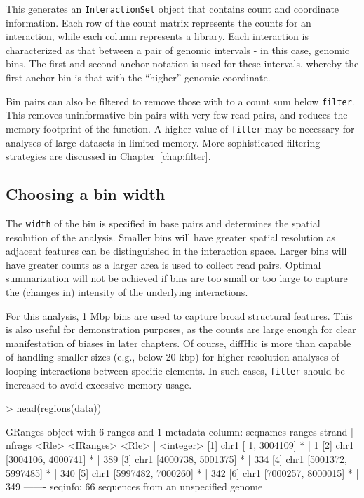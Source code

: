 \documentclass[12pt]{report}
\renewenvironment{Schunk}{\vspace{0pt}}{\vspace{0pt}}
\newcommand{\pkgname}{diffHic}
\newcommand{\code}[1]{{\small\texttt{#1}}}
\begin{document}
This generates an \code{InteractionSet} object that contains count and coordinate information.
Each row of the count matrix represents the counts for an interaction, while each column represents a library.
Each interaction is characterized as that between a pair of genomic intervals - in this case, genomic bins.
The first and second anchor notation is used for these intervals, whereby the first anchor bin is that with the ``higher'' genomic coordinate.

Bin pairs can also be filtered to remove those with to a count sum below \code{filter}.
This removes uninformative bin pairs with very few read pairs, and reduces the memory footprint of the function.
A higher value of \code{filter} may be necessary for analyses of large datasets in limited memory.
More sophisticated filtering strategies are discussed in Chapter~\ref{chap:filter}.

\subsection{Choosing a bin width}
The \code{width} of the bin is specified in base pairs and determines the spatial resolution of the analysis.
Smaller bins will have greater spatial resolution as adjacent features can be distinguished in the interaction space.
Larger bins will have greater counts as a larger area is used to collect read pairs.
Optimal summarization will not be achieved if bins are too small or too large to capture the (changes in) intensity of the underlying interactions.

For this analysis, 1 Mbp bins are used to capture broad structural features.
This is also useful for demonstration purposes, as the counts are large enough for clear manifestation of biases in later chapters.
Of course, \pkgname{} is more than capable of handling smaller sizes (e.g., below 20 kbp) for higher-resolution analyses of looping interactions between specific elements.
In such cases, \code{filter} should be increased to avoid excessive memory usage.

\begin{Schunk}
\begin{Sinput}
> head(regions(data))
\end{Sinput}
\begin{Soutput}
GRanges object with 6 ranges and 1 metadata column:
      seqnames             ranges strand |    nfrags
         <Rle>          <IRanges>  <Rle> | <integer>
  [1]     chr1 [      1, 3004109]      * |         1
  [2]     chr1 [3004106, 4000741]      * |       389
  [3]     chr1 [4000738, 5001375]      * |       334
  [4]     chr1 [5001372, 5997485]      * |       340
  [5]     chr1 [5997482, 7000260]      * |       342
  [6]     chr1 [7000257, 8000015]      * |       349
  -------
  seqinfo: 66 sequences from an unspecified genome
\end{Soutput}
\end{Schunk}
\end{document}
